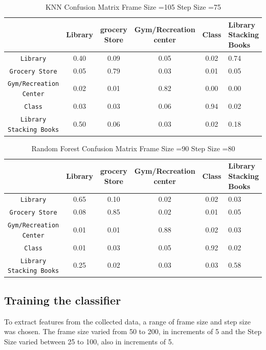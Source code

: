 \documentclass{acm_proc_article-sp}
\begin{document}
\begin{enumerate}
\begin{table}[p]
\centering
\caption{KNN Confusion Matrix Frame Size =105 Step Size =75}
\begin{tabular}{|c|c|c|c|c|l|} \hline
 &Library&grocery Store& Gym/Recreation center& Class & Library Stacking Books\\ \hline
\texttt{Library} & 0.40& 0.09& 0.05& 0.02& 0.74\\ \hline
\texttt{Grocery Store} & 0.05 & 0.79& 0.03& 0.01& 0.05\\ \hline
\texttt{Gym/Recreation Center}& 0.02& 0.01& 0.82& 0.00& 0.00\\ \hline
\texttt{Class}& 0.03& 0.03& 0.06& 0.94& 0.02\\ \hline
\texttt{Library Stacking Books}& 0.50& 0.06& 0.03& 0.02& 0.18\\ \hline
\end{tabular}
\label{table:tableKNN}
\end{table}

\begin{table}[p]
\centering
\caption{Random Forest Confusion Matrix Frame Size =90 Step Size =80}
\begin{tabular}{|c|c|c|c|c|l|} \hline
 &Library&grocery Store& Gym/Recreation center& Class & Library Stacking Books\\ \hline
\texttt{Library} & 0.65& 0.10& 0.02& 0.02& 0.03\\ \hline
\texttt{Grocery Store} & 0.08 & 0.85& 0.02& 0.01& 0.05\\ \hline
\texttt{Gym/Recreation Center}& 0.01& 0.01& 0.88& 0.02& 0.03\\ \hline
\texttt{Class}& 0.01& 0.03& 0.05& 0.92& 0.02\\ \hline
\texttt{Library Stacking Books}& 0.25& 0.02& 0.03& 0.03& 0.58\\ \hline
\end{tabular}
\label{table:tableRF}
\end{table}




\subsection{Training the classifier}
To extract features from the collected data, a range of frame size and step size was chosen. The frame size varied from 50 to 200, in increments of 5 and the Step Size varied between 25 to 100, also in increments of 5.
\\


\end{enumerate}
\end{document}

